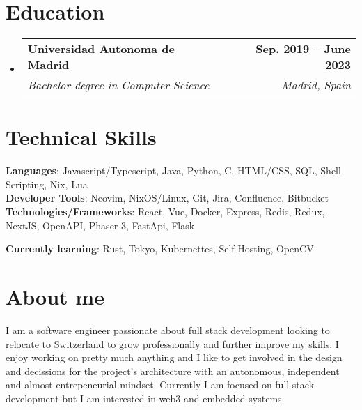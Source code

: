 \documentclass[letterpaper,11pt]{article}
\makeatletter
\newcommand{\resumeSubheading}[4]{
  \vspace{-2pt}\item
    \begin{tabular*}{1.0\textwidth}[t]{l@{\extracolsep{\fill}}r}
      \textbf{#1} & \textbf{\small #2} \\
      \textit{\small#3} & \textit{\small #4} \\
    \end{tabular*}\vspace{-7pt}
}
\newcommand{\resumeSubHeadingListStart}{\begin{itemize}[leftmargin=0.0in, label={}]}
\newcommand{\resumeSubHeadingListEnd}{\end{itemize}}
\makeatother
\begin{document}
\section{\Large Education}
  \resumeSubHeadingListStart
    \resumeSubheading
      {Universidad Autonoma de Madrid}{Sep. 2019 -- June 2023}
      {Bachelor degree in Computer Science}{Madrid, Spain}
  \resumeSubHeadingListEnd\vspace{-4pt}

\section{\Large Technical Skills}
 \begin{itemize}[leftmargin=0.15in, label={}]
    \small{\item{
     \textbf{Languages}{: Javascript/Typescript, Java, Python, C, HTML/CSS, SQL, Shell Scripting, Nix, Lua} \\
     \textbf{Developer Tools}{: Neovim, NixOS/Linux, Git, Jira, Confluence, Bitbucket} \\
     \textbf{Technologies/Frameworks}{: React, Vue, Docker, Express, Redis, Redux, NextJS, OpenAPI, Phaser 3, FastApi, Flask} \\
    }}
     \textbf{Currently learning}{: Rust, Tokyo, Kubernettes, Self-Hosting, OpenCV} \\
 \end{itemize}
 \vspace{-10pt}


 \section{\Large About me}
  I am a software engineer passionate about full stack development looking to relocate to Switzerland to grow professionally and further improve my skills. I enjoy working on pretty much anything and I like to get involved in the design and decissions for the project's architecture with an autonomous, independent and almost entrepeneurial mindset. Currently I am focused on full stack development but I am interested in web3 and embedded systems.
\end{document}
